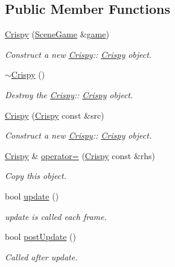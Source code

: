 \subsection*{Public Member Functions}
\begin{DoxyCompactItemize}
\item 
\hyperlink{class_crispy_a78109acb28dc9efc1d74cf952a9709d9}{Crispy} (\hyperlink{class_scene_game}{Scene\+Game} \&\hyperlink{class_a_entity_aa2c05db944a8b7487eb8470dd20211ab}{game})
\begin{DoxyCompactList}\small\item\em Construct a new \hyperlink{class_crispy}{Crispy}\+:\+: \hyperlink{class_crispy}{Crispy} object. \end{DoxyCompactList}\item 
\mbox{\label{class_crispy_aaa1eaad5d27f720792beb6a9119ccc55}} 
\hyperlink{class_crispy_aaa1eaad5d27f720792beb6a9119ccc55}{$\sim$\+Crispy} ()
\begin{DoxyCompactList}\small\item\em Destroy the \hyperlink{class_crispy}{Crispy}\+:\+: \hyperlink{class_crispy}{Crispy} object. \end{DoxyCompactList}\item 
\hyperlink{class_crispy_a648bbdda44870a4df05617f50130cb07}{Crispy} (\hyperlink{class_crispy}{Crispy} const \&src)
\begin{DoxyCompactList}\small\item\em Construct a new \hyperlink{class_crispy}{Crispy}\+:\+: \hyperlink{class_crispy}{Crispy} object. \end{DoxyCompactList}\item 
\hyperlink{class_crispy}{Crispy} \& \hyperlink{class_crispy_a7b82eba5a20747f4412510ad7be548af}{operator=} (\hyperlink{class_crispy}{Crispy} const \&rhs)
\begin{DoxyCompactList}\small\item\em Copy this object. \end{DoxyCompactList}\item 
bool \hyperlink{class_crispy_ab33c8c68fa636df5721581e8f68ceae3}{update} ()
\begin{DoxyCompactList}\small\item\em update is called each frame. \end{DoxyCompactList}\item 
bool \hyperlink{class_crispy_aa83ad22c80b962ee0380c1e394ae8610}{post\+Update} ()
\begin{DoxyCompactList}\small\item\em Called after update. \end{DoxyCompactList}\item 

\end{DoxyCompactItemize}
